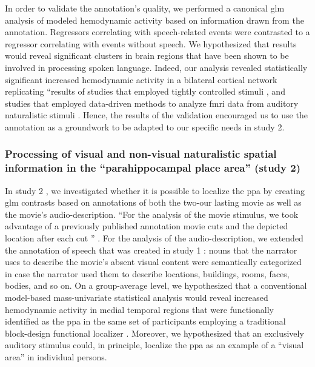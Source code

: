 In order to validate the annotation's quality, we performed a canonical \ac{glm}
analysis of modeled hemodynamic activity based on information drawn from the
annotation.
Regressors correlating with speech-related events were contrasted to a regressor
correlating with events without speech.
We hypothesized that results would reveal significant clusters in brain regions
that have been shown to be involved in processing spoken language.
Indeed, our analysis revealed statistically significant increased hemodynamic
activity in a bilateral cortical network replicating ``results of studies that
employed tightly controlled stimuli \citep[s.][for reviews]{friederici2011brain,
hickok2007cortical,price2012twentyyears}, and studies that employed data-driven
methods to analyze \ac{fmri} data from auditory naturalistic stimuli
\citep{honey2012not, lerner2011topographic, silbert2014coupled}.
Hence, the results of the validation encouraged us to use the annotation as a
groundwork to be adapted to our specific needs in study 2.


\subsubsection{Processing of visual and non-visual naturalistic spatial
information in the ``parahippocampal place area'' (study 2)}

In study 2 \citep{haeusler2022processing}, we investigated whether it is
possible to localize the \ac{ppa} by creating \ac{glm} contrasts
based on annotations of both the two-our lasting movie as well as the movie's
audio-description.
``For the analysis of the movie stimulus, we took advantage of a previously
published annotation movie cuts and the depicted location after each cut
\citep{haeusler2016cutanno}'' \citep{haeusler2022processing}.
For the analysis of the audio-description, we extended the annotation of speech
that was created in study 1 \citep{haeusler2021speechanno}:
%
nouns that the narrator uses to describe the movie's absent visual content were
semantically categorized in case the narrator used them to describe locations,
buildings, rooms, faces, bodies, and so on.
On a group-average level, we hypothesized that a conventional model-based
mass-univariate statistical analysis would reveal increased hemodynamic activity
in medial temporal regions that were functionally identified as the \ac{ppa} in
the same set of participants employing a traditional block-design functional
localizer \citep{sengupta2016extension}.
Moreover, we hypothesized that an exclusively auditory stimulus could, in
principle, localize the \ac{ppa} as an example of a ``visual area'' in
individual persons.

